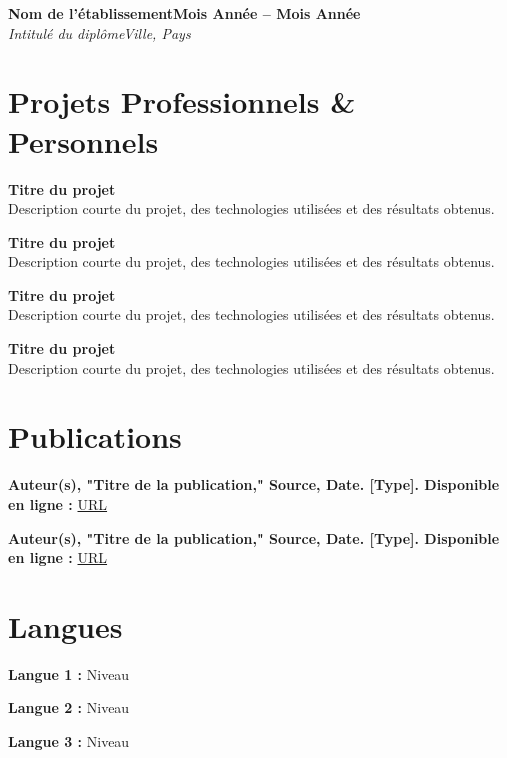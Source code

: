 \documentclass[letterpaper,10pt]{article}
\newcommand{\heading}[2]{
  \hspace{10pt}#1\hfill#2\\
}
\newcommand{\headingBf}[2]{
  \heading{\textbf{#1}}{\textbf{#2}}
}
\newcommand{\headingIt}[2]{
  \heading{\textit{#1}}{\textit{#2}}
}
\newenvironment{resume_list}{
  \vspace{-7pt}
  \begin{itemize}[itemsep=-2px, parsep=1pt, leftmargin=30pt]
}{
  \end{itemize}
}
\begin{document}
\headingBf{Nom de l'établissement}{Mois Année -- Mois Année}
\headingIt{Intitulé du diplôme}{Ville, Pays}


\section{Projets Professionnels \& Personnels}
\begin{resume_list}
  \item \textbf{Titre du projet} \\
  Description courte du projet, des technologies utilisées et des résultats obtenus.

  \item \textbf{Titre du projet} \\
  Description courte du projet, des technologies utilisées et des résultats obtenus.

  \item \textbf{Titre du projet} \\
  Description courte du projet, des technologies utilisées et des résultats obtenus.

  \item \textbf{Titre du projet} \\
  Description courte du projet, des technologies utilisées et des résultats obtenus.
\end{resume_list}


\section{Publications}
\begin{resume_list}
  \item \textbf{Auteur(s), "Titre de la publication," Source, Date. [Type]. Disponible en ligne :}
    \href{https://example.com}{URL}

  \item \textbf{Auteur(s), "Titre de la publication," Source, Date. [Type]. Disponible en ligne :}
    \href{https://example.com}{URL}
\end{resume_list}


\section{Langues}
\begin{resume_list}
  \item \textbf{Langue 1 :} Niveau
  \item \textbf{Langue 2 :} Niveau
  \item \textbf{Langue 3 :} Niveau
\end{resume_list}
\end{document}
